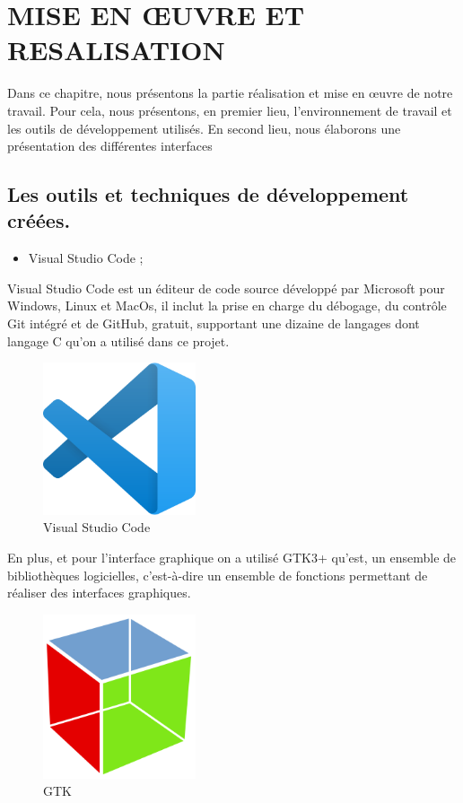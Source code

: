 \chapter{MISE EN ŒUVRE ET RESALISATION }
Dans ce chapitre, nous présentons la partie réalisation et mise en œuvre de notre travail. 
Pour cela, nous présentons, en premier lieu, l’environnement de travail et les outils de développement utilisés. En second lieu, nous élaborons une présentation des différentes interfaces 
\section{Les outils et techniques de développement créées.}\label{sec:section1}
\begin{itemize}
\item  Visual Studio Code ;
\end{itemize}
Visual Studio Code est un éditeur de code source développé par Microsoft pour Windows, Linux et MacOs, il inclut la prise en charge du débogage, du contrôle Git intégré et de GitHub, gratuit, supportant une dizaine de langages dont langage C qu'on a utilisé dans ce projet. 
\begin{figure}[H]
	\centering
	\includegraphics[width=0.4\textwidth]{VSC.PNG}
	  \caption{Visual Studio Code}
	\label{fig:Visual Studio Code}
\end{figure}
En plus, et pour l’interface graphique on a utilisé GTK3+ qu’est, un ensemble de bibliothèques logicielles, c'est-à-dire un ensemble de fonctions permettant de réaliser des interfaces graphiques.
\begin{figure}[H]
	\centering
	\includegraphics[width=0.4\textwidth]{GTK.PNG}
	  \caption{GTK}
	\label{fig:GTK}
\end{figure}
